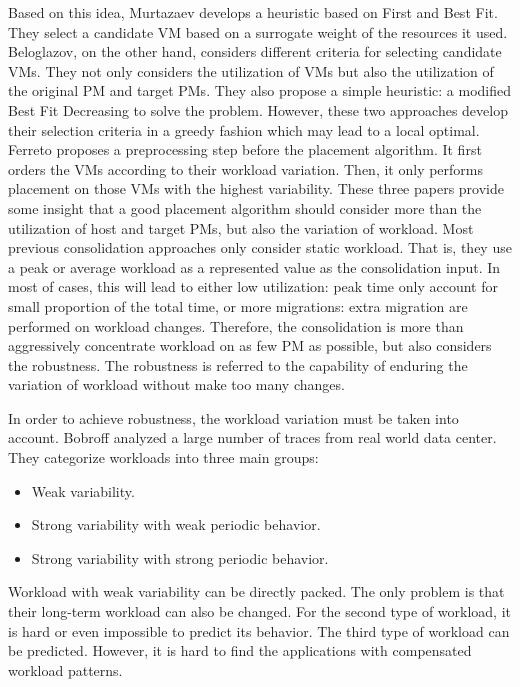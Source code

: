

Based on this idea, Murtazaev develops a heuristic based on First and Best Fit. They select a candidate VM based on a surrogate weight of the resources it used.
Beloglazov, on the other hand, considers different criteria for selecting candidate VMs. They not only considers the utilization of VMs but also the utilization of the original PM and target PMs. They also propose a simple heuristic: a modified Best Fit Decreasing to solve the problem. However, these two approaches develop their selection criteria in a greedy fashion which may lead to a local optimal. 
Ferreto proposes a preprocessing step before the placement algorithm. It first orders the VMs according to their workload variation. Then, it only performs placement on those VMs with  the highest variability. These three papers provide some insight that a good placement algorithm should consider more than the utilization of host and target PMs, but also the variation of workload. 
Most previous consolidation approaches \cite{Viswanathan:2012ej, Feller:2011vs} only consider static workload. That is, they use a peak or average workload as a represented value as the consolidation input. In most of cases, this will lead to either low utilization: peak time only account for small proportion of the total time, or more migrations: extra migration are performed on workload changes. 
Therefore, the consolidation is more than aggressively concentrate workload on as few PM as possible, but also considers the robustness. The robustness is referred to the capability of enduring the variation of workload without make too many changes.

In order to achieve robustness, the workload variation must be taken into account. Bobroff \cite{Bobroff:2007ec} analyzed a large number of traces from real world data center. They categorize workloads into three main groups: 

\begin{itemize}
	\item Weak variability.
	\item Strong variability with weak periodic behavior.
	\item Strong variability with strong periodic behavior.
\end{itemize}
Workload with weak variability can be directly packed. The only problem is that their long-term workload can also be changed. 
For the second type of workload, it is hard or even impossible to predict its behavior. The third type of workload can be predicted. However, it is hard to find the applications with compensated workload patterns. 

